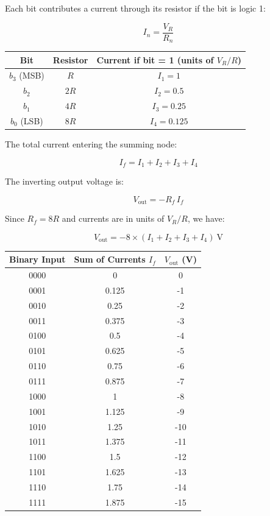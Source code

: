 \begin{solutionblock}
Each bit contributes a current through its resistor if the bit is logic 1:

\[
I_n = \frac{V_R}{R_n}
\]

\begin{center}
\begin{tabular}{|c|c|c|}
\hline
Bit & Resistor & Current if bit = 1 (units of $V_R/R$) \\
\hline
$b_3$ (MSB) & $R$   & $I_1 = 1$ \\
$b_2$        & $2R$  & $I_2 = 0.5$ \\
$b_1$        & $4R$  & $I_3 = 0.25$ \\
$b_0$ (LSB) & $8R$  & $I_4 = 0.125$ \\
\hline
\end{tabular}
\end{center}
\end{solutionblock}

\begin{solutionblock}

The total current entering the summing node:

\[
I_f = I_1 + I_2 + I_3 + I_4
\]

The inverting output voltage is:

\[
V_{\text{out}} = - R_f \, I_f
\]

Since $R_f = 8R$ and currents are in units of $V_R/R$, we have:

\[
V_{\text{out}} = -8 \times (I_1 + I_2 + I_3 + I_4) \ \text{V}
\]
\end{solutionblock}


\begin{solutionblock}
\begin{center}
\begin{tabular}{|c|c|c|}
\hline
Binary Input & Sum of Currents $I_f$ & $V_{\text{out}}$ (V) \\
\hline
0000 & 0     & 0   \\
0001 & 0.125 & -1  \\
0010 & 0.25  & -2  \\
0011 & 0.375 & -3  \\
0100 & 0.5   & -4  \\
0101 & 0.625 & -5  \\
0110 & 0.75  & -6  \\
0111 & 0.875 & -7  \\
1000 & 1     & -8  \\
1001 & 1.125 & -9  \\
1010 & 1.25  & -10 \\
1011 & 1.375 & -11 \\
1100 & 1.5   & -12 \\
1101 & 1.625 & -13 \\
1110 & 1.75  & -14 \\
1111 & 1.875 & -15 \\
\hline
\end{tabular}
\end{center}
\end{solutionblock}

